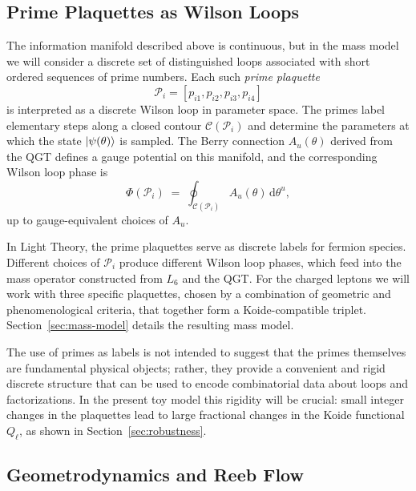 \documentclass[12pt]{article}
\begin{document}
\subsection{Prime Plaquettes as Wilson Loops}

The information manifold described above is continuous, but in the mass model
we will consider a discrete set of distinguished loops associated with short
ordered sequences of prime numbers.  Each such \emph{prime plaquette}
\begin{equation}
  \mathcal{P}_i = [p_{i1},p_{i2},p_{i3},p_{i4}]
\end{equation}
is interpreted as a discrete Wilson loop in parameter space.  The primes label
elementary steps along a closed contour $\mathcal{C}(\mathcal{P}_i)$ and
determine the parameters at which the state $\ket{\psi(\theta)}$ is sampled.
The Berry connection $A_u(\theta)$ derived from the QGT defines a gauge
potential on this manifold, and the corresponding Wilson loop phase is
\begin{equation}
  \Phi(\mathcal{P}_i)
  \;=\;
  \oint_{\mathcal{C}(\mathcal{P}_i)} A_u(\theta)\,\mathrm{d}\theta^u,
\end{equation}
up to gauge-equivalent choices of $A_u$.

In Light Theory, the prime plaquettes serve as discrete labels for fermion
species.  Different choices of $\mathcal{P}_i$ produce different Wilson loop
phases, which feed into the mass operator constructed from $L_6$ and the QGT.
For the charged leptons we will work with three specific plaquettes, chosen by
a combination of geometric and phenomenological criteria, that together form a
Koide-compatible triplet.  Section~\ref{sec:mass-model} details the resulting
mass model.

The use of primes as labels is not intended to suggest that the primes
themselves are fundamental physical objects; rather, they provide a convenient
and rigid discrete structure that can be used to encode combinatorial data
about loops and factorizations.  In the present toy model this rigidity will
be crucial: small integer changes in the plaquettes lead to large fractional
changes in the Koide functional $Q_\ell$, as shown in Section~\ref{sec:robustness}.

\subsection{Geometrodynamics and Reeb Flow}
\end{document}
